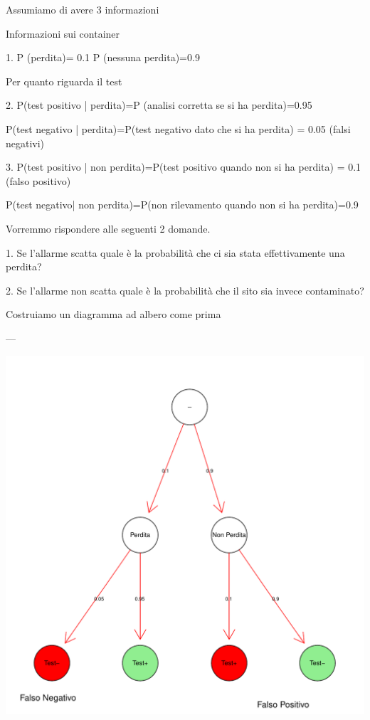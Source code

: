 \documentclass[onecolumn,12pt]{book}\usepackage[]{graphicx}\usepackage[]{color}
\makeatletter
\def\maxwidth{ %
  \ifdim\Gin@nat@width>\linewidth
    \linewidth
  \else
    \Gin@nat@width
  \fi
}
\newenvironment{knitrout}{}{} %
\makeatother
\begin{document}
Assumiamo di avere 3 informazioni

Informazioni sui container

1.   P (perdita)= 0.1    
     P (nessuna perdita)=0.9

Per quanto riguarda il test

2.   P(test positivo | perdita)=P (analisi corretta se si ha perdita)=0.95

     P(test negativo | perdita)=P(test negativo dato che  si ha perdita) =  0.05  (falsi negativi)

3.   P(test positivo | non perdita)=P(test positivo quando non si ha perdita) =    0.1  (falso positivo)
      
      P(test negativo| non perdita)=P(non rilevamento quando non si ha perdita)=0.9
      

Vorremmo rispondere alle seguenti 2 domande.

1.  Se l'allarme scatta quale è la probabilità che ci sia stata effettivamente una perdita?

2.  Se l'allarme non scatta quale è la probabilità che il sito sia invece contaminato?

Costruiamo un diagramma ad albero come prima

---



\begin{knitrout}
\color{fgcolor}
\includegraphics[width=\maxwidth]{figure/unnamed-chunk-20-1} 

\end{knitrout}
\end{document}
